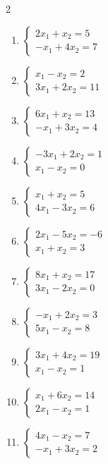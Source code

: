 \begin{multicols}{2}
\begin{enumerate}[label=\arabic*., leftmargin=*]
\item $\begin{cases}2x_1+x_2=5\\-x_1+4x_2=7\end{cases}$

\item $\begin{cases}x_1-x_2=2\\3x_1+2x_2=11\end{cases}$

\item $\begin{cases}6x_1+x_2=13\\-x_1+3x_2=4\end{cases}$

\item $\begin{cases}-3x_1+2x_2=1\\x_1-x_2=0\end{cases}$

\item $\begin{cases}x_1+x_2=5\\4x_1-3x_2=6\end{cases}$

\item $\begin{cases}2x_1-5x_2=-6\\x_1+x_2=3\end{cases}$

\item $\begin{cases}8x_1+x_2=17\\3x_1-2x_2=0\end{cases}$

\item $\begin{cases}-x_1+2x_2=3\\5x_1-x_2=8\end{cases}$

\item $\begin{cases}3x_1+4x_2=19\\x_1-x_2=1\end{cases}$

\item $\begin{cases}x_1+6x_2=14\\2x_1-x_2=1\end{cases}$

\item $\begin{cases}4x_1-x_2=7\\-x_1+3x_2=2\end{cases}$


\end{enumerate}
\end{multicols}
